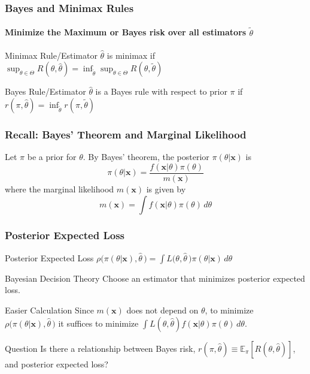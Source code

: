 \begin{frame}
  \frametitle{Bayes and Minimax Rules}
  \framesubtitle{Minimize the Maximum or Bayes risk over all estimators $\widetilde{\theta}$}

  \begin{block}{Minimax Rule/Estimator}
    $\widehat{\theta}$ is \alert{minimax} if \hspace{0.5em} $\boxed{\displaystyle\sup_{\theta \in \Theta} R(\theta, \widehat{\theta}) = \displaystyle\inf_{\widetilde{\theta}} \sup_{\theta \in \Theta} R(\theta, \widetilde{\theta})}$

    \vspace{1em}

  \end{block}
  \begin{block}{Bayes Rule/Estimator}
    $\widehat{\theta}$ is a \alert{Bayes rule} with respect to prior $\pi$ if \hspace{0.5em} $\boxed{r(\pi, \widehat{\theta}) = \displaystyle\inf_{\widetilde{\theta}} r(\pi, \widetilde{\theta})}$
  \end{block}

\end{frame}
\begin{frame}
  \frametitle{Recall: Bayes' Theorem and Marginal Likelihood}
  Let $\pi$ be a prior for $\theta$.
  By Bayes' theorem, the \alert{posterior} $\pi(\theta|\mathbf{x})$ is
  \[
    \pi(\theta|\mathbf{x}) = \frac{f(\mathbf{x}|\theta)\pi(\theta)}{m(\mathbf{x})}
  \]
  where the \alert{marginal likelihood} $m(\mathbf{x})$ is given by
  \[
    m(\mathbf{x}) = \int f(\mathbf{x}|\theta) \pi(\theta)\, d\theta
  \]
\end{frame}
\begin{frame}
  \frametitle{Posterior Expected Loss}

  \begin{block}{Posterior Expected Loss}
    $\rho\big(\pi(\theta|\mathbf{x}), \widehat{\theta}\,\big) = \displaystyle \int L\big(\theta, \widehat{\theta}\,\big) \pi(\theta|\mathbf{x})\, d\theta$ 
  \end{block}

  \begin{block}{Bayesian Decision Theory} 
    Choose an estimator that minimizes posterior expected loss.
  \end{block}

  \begin{block}{Easier Calculation}
    Since $m(\mathbf{x})$ does not depend on $\theta$, to minimize $\rho\big(\pi(\theta|\mathbf{x}),\widehat{\theta}\,\big)$ it suffices to minimize $\int L(\theta, \widehat{\theta}) f(\mathbf{x}|\theta)\pi(\theta)\, d\theta$.
  \end{block}

  \begin{alertblock}{Question}
    Is there a relationship between Bayes risk, $r(\pi, \widehat{\theta}) \equiv\mathbb{E}_\pi[R(\theta, \widehat{\theta})]$, and posterior expected loss?
  \end{alertblock}

\end{frame}
